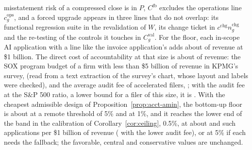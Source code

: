 misstatement risk of a compressed close is in $P$, $C^{\mathrm{fb}}$ excludes the operations line $c^{\mathrm{ops}}_g$, and a forced upgrade appears in three lines that do not overlap: its functional regression suite in the revalidation of $W$, its change ticket in $c^{\mathrm{chg}}n^{\mathrm{chg}}_g$ and the re-testing of the controls it touches in $C^{\mathrm{val}}_g$. For the floor, each in-scope AI application with a line like the invoice application's adds about \acctItgcShare{} of revenue at \$1 billion. The direct cost of accountability at that size is about \acctAminDirect{} of revenue: the SOX program budget of a firm with less than \$5 billion of revenue in KPMG's survey, \acctAminKpmgSmall{} (read from a text extraction of the survey's chart, whose layout and labels were checked), and the average audit fee of accelerated filers, \acctAminAuditFee{} \citep{kpmg2025sox,auditanalytics2023fees}; with the audit fee at the S\&P 500 ratio, a lower bound for a filer of this size, it is \acctAminDirectLo. With the cheapest admissible design of Proposition~\ref{prop:acct-amin}, the bottom-up floor is about \acctItgcFloorFive{} at a remote threshold of 5\% and \acctItgcFloorOne{} at 1\%, and it reaches the lower end of the band in the calibration of Corollary~\ref{cor:ceiling}, 0.5\%, at about \acctItgcBandNFive{} and \acctItgcBandNOne{} such applications per \$1 billion of revenue (\acctItgcBandNLo{} with the lower audit fee), or \acctItgcBandNfbFive{} at 5\% if each needs the fallback; the favorable, central and conservative values are unchanged.
